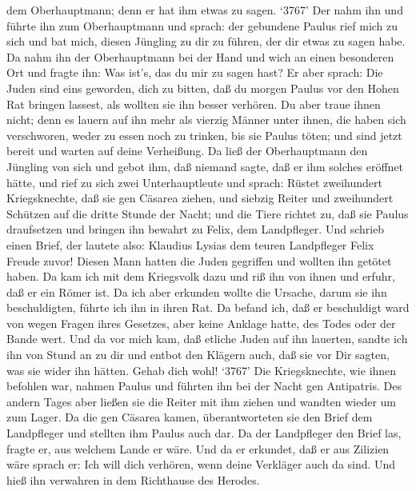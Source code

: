 dem Oberhauptmann; denn er hat ihm etwas zu sagen.  `3767'
Der nahm ihn und führte ihn zum Oberhauptmann und sprach: der gebundene
Paulus rief mich zu sich und bat mich, diesen Jüngling zu dir zu führen,
der dir etwas zu sagen habe.  Da nahm ihn der Oberhauptmann
bei der Hand und wich an einen besonderen Ort und fragte ihn: Was ist's,
das du mir zu sagen hast?  Er aber sprach: Die Juden sind
eins geworden, dich zu bitten, daß du morgen Paulus vor den Hohen Rat
bringen lassest, als wollten sie ihn besser verhören.  Du
aber traue ihnen nicht; denn es lauern auf ihn mehr als vierzig Männer
unter ihnen, die haben sich verschworen, weder zu essen noch zu trinken,
bis sie Paulus töten; und sind jetzt bereit und warten auf deine
Verheißung.  Da ließ der Oberhauptmann den Jüngling von
sich und gebot ihm, daß niemand sagte, daß er ihm solches eröffnet
hätte,  und rief zu sich zwei Unterhauptleute und sprach:
Rüstet zweihundert Kriegsknechte, daß sie gen Cäsarea ziehen, und
siebzig Reiter und zweihundert Schützen auf die dritte Stunde der Nacht;
 und die Tiere richtet zu, daß sie Paulus draufsetzen und
bringen ihn bewahrt zu Felix, dem Landpfleger.  Und schrieb
einen Brief, der lautete also:  Klaudius Lysias dem teuren
Landpfleger Felix Freude zuvor!  Diesen Mann hatten die
Juden gegriffen und wollten ihn getötet haben. Da kam ich mit dem
Kriegsvolk dazu und riß ihn von ihnen und erfuhr, daß er ein Römer ist.
 Da ich aber erkunden wollte die Ursache, darum sie ihn
beschuldigten, führte ich ihn in ihren Rat.  Da befand ich,
daß er beschuldigt ward von wegen Fragen ihres Gesetzes, aber keine
Anklage hatte, des Todes oder der Bande wert.  Und da vor
mich kam, daß etliche Juden auf ihn lauerten, sandte ich ihn von Stund
an zu dir und entbot den Klägern auch, daß sie vor Dir sagten, was sie
wider ihn hätten. Gehab dich wohl!  `3767' Die
Kriegsknechte, wie ihnen befohlen war, nahmen Paulus und führten ihn bei
der Nacht gen Antipatris.  Des andern Tages aber ließen sie
die Reiter mit ihm ziehen und wandten wieder um zum Lager. 
Da die gen Cäsarea kamen, überantworteten sie den Brief dem Landpfleger
und stellten ihm Paulus auch dar.  Da der Landpfleger den
Brief las, fragte er, aus welchem Lande er wäre. Und da er erkundet, daß
er aus Zilizien wäre sprach er:  Ich will dich verhören,
wenn deine Verkläger auch da sind. Und hieß ihn verwahren in dem
Richthause des Herodes.

